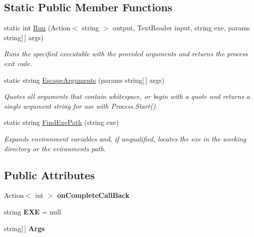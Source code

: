 \subsection*{Static Public Member Functions}
\begin{DoxyCompactItemize}
\item 
static int \hyperlink{class_doxy_runner_a7458975df0c43d397051f225d6def184}{Run} (Action$<$ string $>$ output, Text\+Reader input, string exe, params string\mbox{[}$\,$\mbox{]} args)
\begin{DoxyCompactList}\small\item\em Runs the specified executable with the provided arguments and returns the process\textquotesingle{} exit code. \end{DoxyCompactList}\item 
static string \hyperlink{class_doxy_runner_a9e1ad0bb37f42899aeac2e2fb59cb769}{Escape\+Arguments} (params string\mbox{[}$\,$\mbox{]} args)
\begin{DoxyCompactList}\small\item\em Quotes all arguments that contain whitespace, or begin with a quote and returns a single argument string for use with Process.\+Start(). \end{DoxyCompactList}\item 
static string \hyperlink{class_doxy_runner_a0923bf6769c3b99b4fb8e9ce67877a94}{Find\+Exe\+Path} (string exe)
\begin{DoxyCompactList}\small\item\em Expands environment variables and, if unqualified, locates the exe in the working directory or the evironment\textquotesingle{}s path. \end{DoxyCompactList}\end{DoxyCompactItemize}
\subsection*{Public Attributes}
\begin{DoxyCompactItemize}
\item 
Action$<$ int $>$ {\bfseries on\+Complete\+Call\+Back}\hypertarget{class_doxy_runner_ac1401822d6b3dea5626b786a94aa98d5}{}\label{class_doxy_runner_ac1401822d6b3dea5626b786a94aa98d5}

\item 
string {\bfseries E\+XE} = null\hypertarget{class_doxy_runner_a9661f03da50c7783e9bc99e2a92f14e6}{}\label{class_doxy_runner_a9661f03da50c7783e9bc99e2a92f14e6}

\item 
string\mbox{[}$\,$\mbox{]} {\bfseries Args}\hypertarget{class_doxy_runner_a015e8e8211c24140065dfc92f5fba71b}{}\label{class_doxy_runner_a015e8e8211c24140065dfc92f5fba71b}

\end{DoxyCompactItemize}


